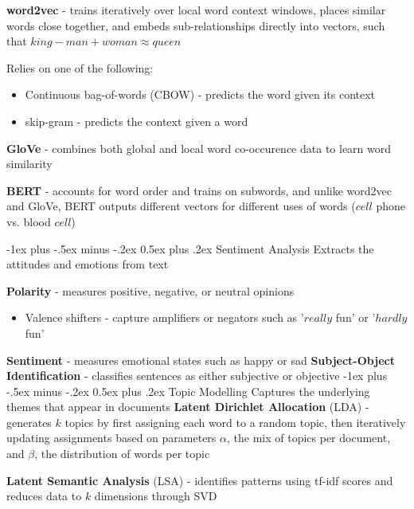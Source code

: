 \documentclass[10pt,landscape]{article}
\makeatletter
\renewcommand{\subsection}{\@startsection{subsection}{2}{0mm}%
                                {-1ex plus -.5ex minus -.2ex}%
                                {0.5ex plus .2ex}%
                                {\normalfont\normalsize\bfseries}}
\makeatother
\begin{document}
\begin{multicols}{3}
    \textbf{word2vec} - trains iteratively over local  word context windows, places similar words close together, and embeds sub-relationships directly into vectors, such that $king - man + woman \approx queen$

    Relies on one of the following:
    \begin{itemize}[label={--},leftmargin=4mm]
        \itemsep -.4mm
        \item Continuous bag-of-words (CBOW) - predicts the word given its context
        \item skip-gram - predicts the context given a word
    \end{itemize}

    \textbf{GloVe} - combines both global and local word co-occurence data to learn word similarity

    \textbf{BERT} - accounts for word order and trains on subwords, and unlike word2vec and GloVe, BERT outputs different vectors for different uses of words ($cell$ phone vs. blood $cell$)

    \subsection{Sentiment Analysis}
    Extracts the attitudes and emotions from text

    \textbf{Polarity} - measures positive, negative, or neutral opinions
    \begin{itemize}[label={--},leftmargin=4mm]
        \itemsep -.4mm
        \item Valence shifters - capture amplifiers or negators such as '$really$ fun' or '$hardly$ fun'
    \end{itemize}
    \textbf{Sentiment} - measures emotional states such as happy or sad
    \textbf{Subject-Object Identification} - classifies sentences as either subjective or objective
    \subsection{Topic Modelling}
    Captures the underlying themes that appear in documents
    \textbf{Latent Dirichlet Allocation} (LDA) - generates $k$ topics by first assigning each word to a random topic, then iteratively updating assignments based on parameters $\alpha$, the mix of topics per document, and $\beta$, the distribution of words per topic

    \textbf{Latent Semantic Analysis} (LSA) - identifies patterns using tf-idf scores and reduces data to $k$ dimensions through SVD
    \columnbreak


\end{multicols}
\end{document}
